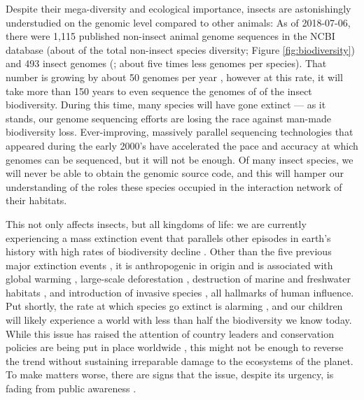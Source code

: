 Despite their mega-diversity and ecological importance, insects are
astonishingly understudied on the genomic level compared to other
animals: As of 2018-07-06, there were 1,115 published non-insect animal
genome sequences in the NCBI database \citep{OLeary2016} (about 
of the total non-insect species diversity; Figure
\ref{fig:biodiversity}) and 493 insect genomes (; about five
times less genomes per species).  That number is growing by about 50
genomes per year \citep{OLeary2016}, however at this rate, it will take
more than 150 years to even sequence the genomes of  of the insect
biodiversity.  During this time, many species will have gone extinct ---
as it stands, our genome sequencing efforts are losing the race against
man-made biodiversity loss.  Ever-improving, massively parallel
sequencing technologies that appeared during the early 2000's
\citep{Behjati2013} have accelerated the pace and accuracy at which
genomes can be sequenced, but it will not be enough.  Of many insect
species, we will never be able to obtain the genomic source code, and
this will hamper our understanding of the roles these species occupied
in the interaction network of their habitats.

\label{mass-extinction}%
This not only affects insects, but all kingdoms of life: we are
currently experiencing a mass extinction event that parallels other
episodes in earth's history with high rates of biodiversity decline
\citep{Pimm1995, Dirzo2003, Schipper2008, Barnosky2011, Dirzo2014}.
Other than the five previous major extinction events
\citep{Kolbert2014}, it is anthropogenic in origin \citep{Leakey1996,
Ceballos2015} and is associated with global warming \citep{Cook2016,
Wuebbles2017}, large-scale deforestation \citep{Wright2005}, destruction
of marine and freshwater habitats \citep{Burkhead2012}, and introduction
of invasive species \citep{Mooney2001}, all hallmarks of human
influence.  Put shortly, the rate at which species go extinct is alarming
\citep{Newbold2016, Ceballos2017, Hallmann2017}, and our children will
likely experience a world with less than half the biodiversity we know
today.  While this issue has raised the attention of country leaders and
conservation policies are being put in place worldwide
\citep{Puntaru2017}, this might not be enough to reverse the trend
without sustaining irreparable damage to the ecosystems of the planet.
To make matters worse, there are signs that the issue, despite its
urgency, is fading from public awareness \citep{Kusmanoff2017}. 

